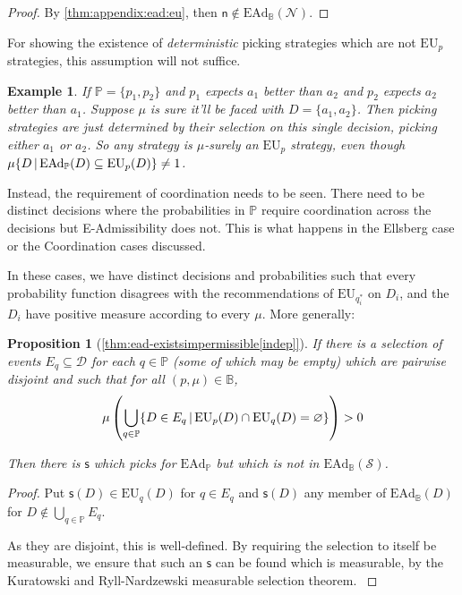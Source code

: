 \documentclass[a4paper]{article}
\newtheorem{proposition}[theorem]{Proposition}
\newtheorem{example}{Example}
\renewcommand\P{\mathbb{P}} %
\newcommand\EU{\mathrm{EU}}
\newcommand\EAd{\mathrm{EAd}}
\newcommand{\Decs}{\mathcal{D}}
\renewcommand\S{\mathcal{S}}
\newcommand\s{\mathsf{s}}
\newcommand{\n}{\mathsf{n}}
\renewcommand{\nu}{\n}
\newcommand\Nu{\mathcal{N}}
\newcommand{\IB}{\mathbb{B}}
\newcommand{\IP}{\P}
\renewcommand{\color}[1]{}
\newenvironment{colored}[1]{\leavevmode\color{#1}}{}
\newcommand\SetDelimiter[1][]{
	\nonscript\,#1\vert \allowbreak \nonscript\,\mathopen{}}
\providecommand\given{\SetDelimiter}
\renewcommand{\emptyset}{\varnothing}
\newenvironment{CCM rewritten}
{\begingroup\color{blue}} %
{\endgroup}              %
\begin{document}
\begin{colored}{violet}
\begin{proof}
	 By \cref{thm:appendix:ead:eu}, then $\nu\notin\EAd_\IB(\Nu)$. 
\end{proof}

For showing the existence of \emph{deterministic} picking strategies which are not $\EU_p$ strategies, this assumption will not suffice. 
\begin{example}
	If $\IP=\{p_1,p_2\}$ and $p_1$ expects $a_1$ better than $a_2$ and $p_2$ expects $a_2$ better than $a_1$. Suppose $\mu$ is sure it'll be faced with $D=\{a_1,a_2\}$. Then picking strategies are just determined by their selection on this single decision, picking either $a_1$ or $a_2$. So any strategy is $\mu$-surely an $\EU_p$ strategy, even though $\mu\{D\given \EAd_\IP(D)\subseteq\EU_p(D)\}\neq 1$. 
\end{example}

Instead, the requirement of coordination needs to be seen. There need to be distinct decisions where the probabilities in $\IP$  require coordination across the decisions but E-Admissibility does not. This is what happens in the Ellsberg case or the Coordination cases discussed. 

In these cases, we have distinct decisions and probabilities such that every probability function disagrees with the recommendations of $\EU_{q^*_i}$ on $D_i$, and the $D_i$ have positive measure according to every $\mu$. More generally:
\begin{proposition}[\cref{thm:ead-existsimpermissible[indep]}]
	If there is a selection of events $E_q\subseteq\Decs$ for each $q\in\IP$ (some of which may be empty) which are pairwise disjoint and such that for all $(p,\mu)\in\IB$, 
	\[
	\mu\left(\bigcup_{q\in\IP}\{D\in E_q\given \EU_p(D)\cap\EU_q(D)=\emptyset\}\right)>0
	\]
	
	Then there is $\s$ which picks for $\EAd_\IP$ but which is not in $\EAd_\IB(\S)$. 
\end{proposition}
\begin{proof}
	Put $\s(D)\in \EU_q(D)$ for $q\in E_q$ and $\s(D)$ any member of $\EAd_\IB(D)$ for $D\notin \bigcup_{q\in\IP}E_q$. 
	
	As they are disjoint, this is well-defined. \begin{colored}
		{blue}
		By requiring the selection to itself be measurable, we ensure that such an $\s$ can be found which is measurable, by the Kuratowski and Ryll-Nardzewski measurable selection theorem.
	\end{colored}
	

\end{proof}
\end{colored}
\end{document}
